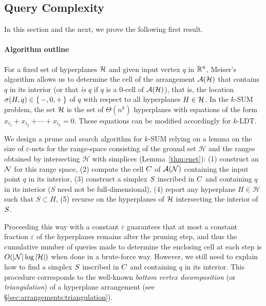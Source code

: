 \subsection{Query Complexity}%
\label{paper:ksum-algorithm:contrib:query-complexity}

In this section and the next, we prove the following first result.
\restate{\TheoremKSUMCube*}

\paragraph{Algorithm outline}
For a fixed set of hyperplanes \(\mathcal{H}\) and given input vertex \(q\) in \(\mathbb{R}^n\),
Meiser's algorithm allows us to determine the cell of the arrangement
$\mathcal{A}(\mathcal{H})$ that contains $q$ in its interior (or that \emph{is} $q$ if
$q$ is a $0$-cell of $\mathcal{A}(\mathcal{H})$), that is, the location $\sigma(H,q) \in
\left\{\,{-, 0, +}\,\right\}$ of \(q\) with respect to all hyperplanes $H \in \mathcal{H}$. In the \(k\)-SUM
problem, the set $\mathcal{H}$ is the set of $\Theta(n^k)$ hyperplanes with equations of the
form $x_{i_1} + x_{i_2} + \cdots + x_{i_k} = 0$.
These equations can be modified accordingly for \(k\)-LDT.

We design a prune and search algorithm for \(k\)-SUM relying on
a lemma on the size of \(\varepsilon\)-nets for the range-space consisting of
the ground set \(\mathcal{H}\) and the ranges obtained by intersecting
\(\mathcal{H}\) with simplices (Lemma~\ref{thm:enet}):
(1) construct an \enet{} \(\mathcal{N}\) for this range space,
(2) compute the cell \(C\) of \(\mathcal{A}(\mathcal{N})\) containing the input
point $q$ in its interior,
(3) construct a simplex \(S\) inscribed in \(C\) and containing
\(q\) in its interior (\(S\) need not be full-dimensional),
(4) report any hyperplane \(H \in \mathcal{H}\) such that \(S \subset H\),
(5) recurse on the hyperplanes of \(\mathcal{H}\) intersecting the interior of
\(S\).

Proceeding this way with a constant $\varepsilon$ guarantees that at most a
constant fraction \(\varepsilon\) of the hyperplanes remains after the pruning step,
and thus the cumulative number of queries made to determine the enclosing cell at
each step is $O(|\mathcal{N}| \log |{\mathcal{H}}|)$ when done in a brute-force way.
However, we still need to explain how to find a simplex \(S\) inscribed
in \(C\) and containing \(q\) in its interior.
%
This procedure corresponds to the well-known
\emph{bottom vertex decomposition} (or \emph{triangulation}) of a hyperplane
arrangement (see \S\ref{sec:arrangements:triangulation}).

